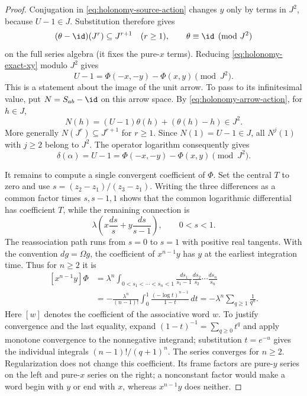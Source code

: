 \begin{proof}
Conjugation in \eqref{eq:holonomy-source-action} changes $y$ only by
terms in $J^2$, because $U-1\in J$.  Substitution therefore gives
\[
 (\theta-\id)(J^r)\subseteq J^{r+1}\quad(r\geq1),
 \qquad\theta\equiv\id\pmod{J^2}
\]
on the full series algebra (it fixes the pure-$x$ terms).
Reducing \eqref{eq:holonomy-exact-xy} modulo $J^2$ gives
\begin{equation}\label{eq:holonomy-unit-difference}
 U-1=\Phi(-x,-y)-\Phi(x,y)\pmod{J^2}.
\end{equation}
This is a statement about the image of the unit arrow.  To pass to its
infinitesimal value, put $N=S_{ab}-\id$ on this arrow space.  By
\eqref{eq:holonomy-arrow-action}, for $h\in J$,
\[
 N(h)=(U-1)\theta(h)+(\theta(h)-h)\in J^2.
\]
More generally $N(J^r)\subseteq J^{r+1}$ for $r\geq1$.
Since $N(1)=U-1\in J$, all $N^j(1)$ with $j\geq2$ belong to $J^2$.
The operator logarithm consequently gives
\begin{equation}\label{eq:holonomy-log-depth-one}
 \delta(\alpha)=U-1
 =\Phi(-x,-y)-\Phi(x,y)\pmod{J^2}.
\end{equation}

It remains to compute a single convergent coefficient of $\Phi$.
Set the central $T$ to zero and use
$s=(z_2-z_1)/(z_3-z_1)$.  Writing the three differences as a common
factor times $s,s-1,1$ shows that the common logarithmic differential
has coefficient $T$, while the remaining connection is
\begin{equation}\label{eq:holonomy-interval-connection}
 \lambda\left(x\frac{ds}{s}+y\frac{ds}{s-1}\right),
 \qquad 0<s<1.
\end{equation}
The reassociation path runs from $s=0$ to $s=1$ with positive real
tangents.  With the convention $dg=\Omega g$, the coefficient of
$x^{n-1}y$ has $y$ at the earliest integration time.  Thus for $n\geq2$
it is
\begin{equation}\label{eq:holonomy-zeta-integral}
\begin{split}
 [x^{n-1}y]\Phi
 &=\lambda^n
 \int_{0<s_1<\cdots<s_n<1}
 \frac{ds_1}{s_1-1}\frac{ds_2}{s_2}\cdots\frac{ds_n}{s_n}\\
 &=-\frac{\lambda^n}{(n-1)!}
 \int_0^1\frac{(-\log t)^{n-1}}{1-t}\,dt
 =-\lambda^n\sum_{q\geq1}\frac1{q^n}.
\end{split}
\end{equation}
Here $[w]$ denotes the coefficient of the associative word $w$.
To justify convergence and the last equality, expand
$(1-t)^{-1}=\sum_{q\geq0}t^q$ and apply monotone convergence to the
nonnegative integrand; substitution $t=e^{-u}$ gives the individual
integrals $(n-1)!/(q+1)^n$.  The series converges for $n\geq2$.
Regularization does not change this coefficient.  Its frame factors
are pure-$y$ series on the left and pure-$x$ series on the right; a
nonconstant factor would make a word begin with $y$ or end with $x$,
whereas $x^{n-1}y$ does neither.


\end{proof}
